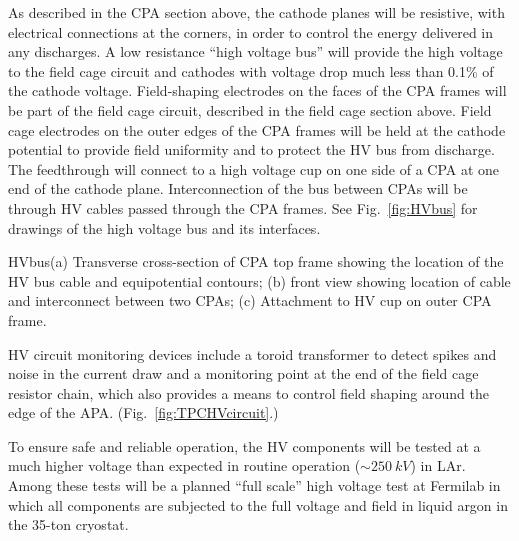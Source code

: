 As described in the CPA section above, the cathode planes will be
resistive, with electrical connections at the corners, in order to
control the energy delivered in any discharges.  A low resistance
``high voltage bus'' will provide the high voltage to the field cage
circuit and cathodes with voltage drop much less than 0.1\% of the
cathode voltage.  Field-shaping electrodes on the faces of the CPA
frames will be part of the field cage circuit, described in the field
cage section above. Field cage electrodes on the outer edges of the
CPA frames will be held at the cathode potential to provide field
uniformity and to protect the HV bus from discharge.  The feedthrough
will connect to a high voltage cup on one side of a CPA at one end of
the cathode plane.  Interconnection of the bus between CPAs will be
through HV cables passed through the CPA frames.  See
Fig.~\ref{fig:HVbus} for drawings of the high voltage bus and its
interfaces.

\begin{cdrfigure}{HVbus}{(a) Transverse cross-section of CPA top frame showing the location of the HV bus cable and equipotential contours; (b) front view showing location of cable and interconnect between two CPAs; (c) Attachment to HV cup on outer CPA frame.}
\end{cdrfigure}

HV circuit monitoring devices include a toroid transformer to detect
spikes and noise in the current draw and a monitoring point at the end
of the field cage resistor chain, which also provides a means to
control field shaping around the edge of the
APA. (Fig.\ \ref{fig:TPCHVcircuit}.)

To ensure safe and reliable operation, the HV components will be
tested at a much higher voltage than expected in routine operation
($\sim\SI{250}{kV}$) in LAr. Among these tests will be a planned
``full scale'' high voltage test at Fermilab in which all components
are subjected to the full voltage and field in liquid argon in the
35-ton cryostat.


